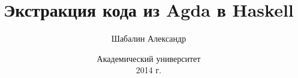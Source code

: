 \documentclass{beamer}
\title{Экстракция кода из Agda в Haskell}
\author{Шабалин Александр}
\institute{{\tiny научный руководитель}\\ \vspace{.10cm}доц. Москвин Д. Н.}
\date{\scriptsize Академический университет\\ \vspace{.10cm}2014 г.}
\begin{document}
\frame{\titlepage}


\end{document}
